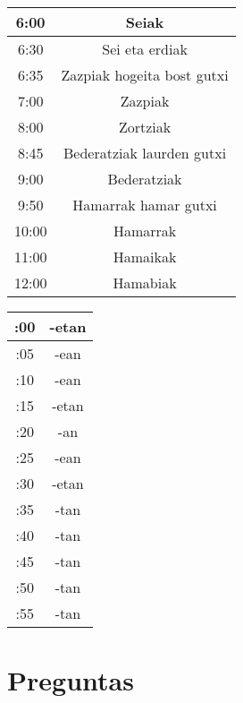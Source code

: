 \documentclass[12pt, a4paper, landscape]{article}
\begin{document}
\begin{table}[h]
\begin{center}
\begin{tabular}{|c|c|}
\hline
6:00 & Seiak\\
\hline
6:30 & Sei eta erdiak\\
\hline
6:35 & Zazpiak hogeita bost gutxi\\
\hline
7:00 & Zazpiak\\
\hline
8:00 & Zortziak\\
\hline
8:45 & Bederatziak laurden gutxi\\
\hline
9:00 & Bederatziak\\
\hline
9:50 & Hamarrak hamar gutxi\\
\hline
10:00 & Hamarrak\\
\hline
11:00 & Hamaikak\\
\hline
12:00 & Hamabiak\\
\hline
\end{tabular}
\quad
\begin{tabular}{|c|c|}
\hline
:00 & -etan \\
\hline
:05 & -ean \\
\hline
:10 & -ean \\
\hline
:15 & -etan \\
\hline
:20 & -an \\
\hline
:25 & -ean \\
\hline
:30 & -etan \\
\hline
:35 & -tan \\
\hline
:40 & -tan \\
\hline
:45 & -tan \\
\hline
:50 & -tan \\
\hline
:55 & -tan \\
\hline
\end{tabular}
\end{center}
\end{table}
\newpage



\section{Preguntas}
\end{document}
